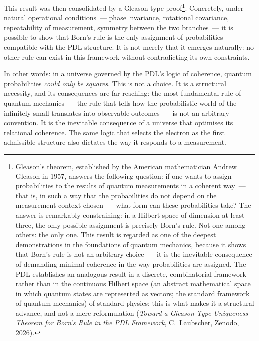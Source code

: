 \documentclass[12pt, a4paper, openright]{book}
\begin{document}
\medskip

This result was then consolidated by a Gleason-type proof\footnote{Gleason's theorem, established by the American mathematician Andrew Gleason in 1957, answers the following question: if one wants to assign probabilities to the results of quantum measurements in a coherent way~--- that is, in such a way that the probabilities do not depend on the measurement context chosen~--- what form can these probabilities take? The answer is remarkably constraining: in a Hilbert space of dimension at least three, the only possible assignment is precisely Born's rule. Not one among others: the only one. This result is regarded as one of the deepest demonstrations in the foundations of quantum mechanics, because it shows that Born's rule is not an arbitrary choice~--- it is the inevitable consequence of demanding minimal coherence in the way probabilities are assigned. The PDL establishes an analogous result in a discrete, combinatorial framework rather than in the continuous Hilbert space (an abstract mathematical space in which quantum states are represented as vectors; the standard framework of quantum mechanics) of standard physics: this is what makes it a structural advance, and not a mere reformulation (\textit{Toward a Gleason-Type Uniqueness Theorem for Born's Rule in the PDL Framework}, C.~Laubscher, Zenodo, 2026).}. Concretely, under natural operational conditions~--- phase invariance, rotational covariance, repeatability of measurement, symmetry between the two branches~--- it is possible to show that Born's rule is the only assignment of probabilities compatible with the PDL structure. It is not merely that it emerges naturally: no other rule can exist in this framework without contradicting its own constraints.

\medskip

In other words: in a universe governed by the PDL's logic of coherence, quantum probabilities \emph{could only be squares}. This is not a choice. It is a structural necessity, and its consequences are far-reaching: the most fundamental rule of quantum mechanics~--- the rule that tells how the probabilistic world of the infinitely small translates into observable outcomes~--- is not an arbitrary convention. It is the inevitable consequence of a universe that optimises its relational coherence. The same logic that selects the electron as the first admissible structure also dictates the way it responds to a measurement.

\end{document}
